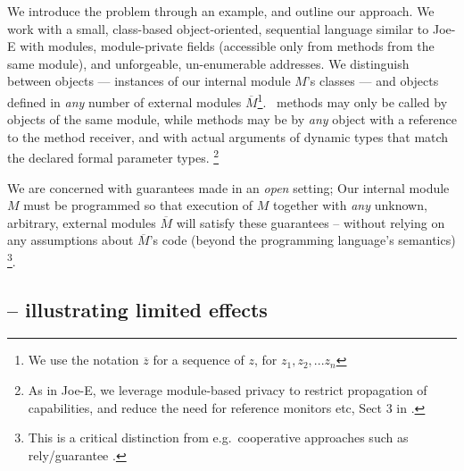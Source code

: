  \newcommand{\pwd}{key}

\renewcommand{\password}{key\xspace}




We introduce the problem  through an example, and outline our
approach.  We work with a  small, class-based object-oriented, sequential language similar to Joe-E \cite{JoeE} with modules,   module-private fields
({accessible} only from   methods {from} the same module),
and unforgeable, un-enumerable addresses.
We distinguish between  \emph{\internalO}
objects --- instances of our internal module $M$'s classes ---
and \emph{\externalO} objects defined in
\emph{any} number of external modules $\overline M$\footnote{We use the notation $\overline z$ for a sequence of $z$, \ie for $z_1,z_2,...z_n$ }.~ 
{ methods  {may only be} called by objects of the same
  module,  while   methods  may be  by \emph{any}
  object with a reference to the method receiver, {and with
  actual arguments of  dynamic types that match} the declared formal parameter types.} 
\footnote{As in Joe-E, we leverage  module-based privacy to restrict propagation of capabilities, and reduce the need for reference monitors etc, \cf Sect 3 in  \cite{JoeE}.}   

 \label{s:concepts}
 
We are concerned with guarantees made in an \emph{open} setting; %
Our internal module
$M$ must be programmed so that 
  execution of $M$  together with \emph{any} unknown, arbitrary, external modules $\overline M$
will satisfy these guarantees --
without relying on any assumptions about $\overline M$'s code
(beyond the programming language's semantics) 
\footnote{
This is a critical distinction from e.g.\
cooperative approaches such as rely/guarantee
\cite{relyGuarantee-HayesJones-setss2017,relyGuarantee-vanStaden-mpc2015}.}.
  
 

\subsection*{ -- illustrating limited effects}  
\label{sec:how}
\label{sec:shop}

